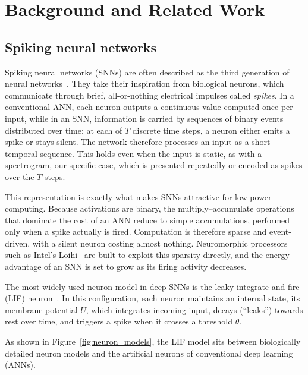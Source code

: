 \chapter{Background and Related Work}
\label{ch:background}

\section{Spiking neural networks}

Spiking neural networks (SNNs) are often described as the third generation of
neural networks~\cite{maass1997networks}. They take their inspiration from biological neurons, which communicate through
brief, all-or-nothing electrical impulses called \emph{spikes}.
In a conventional
ANN, each neuron outputs a continuous value computed once per input, while in an SNN,
information is carried by sequences of binary events distributed over time: at
each of $T$ discrete time steps, a neuron either emits a spike or stays silent.
The network therefore processes an input as a short temporal sequence. This holds
even when the input is static, as with a spectrogram, our specific case, which is presented
repeatedly or encoded as spikes over the $T$ steps.

This representation is exactly what makes SNNs attractive for low-power computing. Because
activations are binary, the multiply--accumulate operations that dominate the cost
of an ANN reduce to simple accumulations, performed only when a spike actually
is fired. Computation is therefore sparse and event-driven, with a silent neuron costing
almost nothing. Neuromorphic processors such as Intel's
Loihi~\cite{davies2018loihi} are built to exploit this sparsity directly, and the
energy advantage of an SNN is set to grow as its firing activity decreases.

The most widely used neuron model in deep SNNs is the leaky integrate-and-fire
(LIF) neuron~\cite{gerstner2014neuronal}. In this configuration, each neuron maintains an internal state,
its membrane potential $U$, which
integrates incoming input, decays (``leaks'') towards rest over time, and triggers
a spike when it crosses a threshold $\theta$.

As shown in Figure~\ref{fig:neuron_models}, the LIF model sits between
biologically detailed neuron models and the artificial neurons of
conventional deep learning (ANNs).


